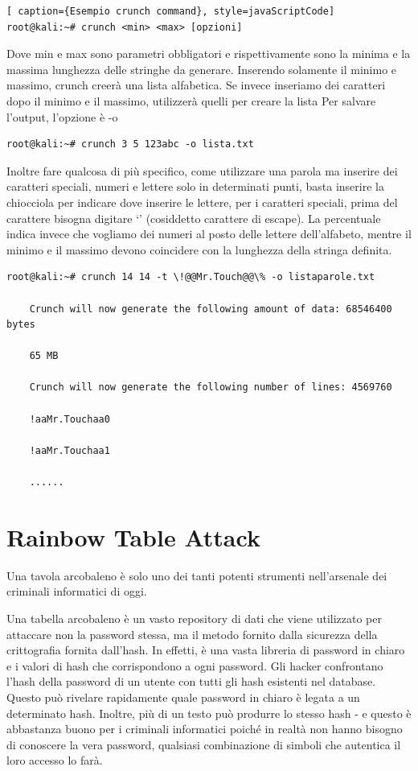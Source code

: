 \begin{lstlisting}[ caption={Esempio crunch command}, style=javaScriptCode]
root@kali:~# crunch <min> <max> [opzioni]
\end{lstlisting}
Dove min e max sono parametri obbligatori e rispettivamente sono la minima e la massima lunghezza delle stringhe da generare.
Inserendo solamente il minimo e massimo, crunch creerà una lista alfabetica.
Se invece inseriamo dei caratteri dopo il minimo e il massimo, utilizzerà quelli per creare la lista
Per salvare l’output, l’opzione è -o
\begin{lstlisting}[caption={Esempio crunch command}, style=javaScriptCode]
root@kali:~# crunch 3 5 123abc -o lista.txt
\end{lstlisting}
Inoltre fare qualcosa di più specifico, come utilizzare una parola ma inserire dei caratteri speciali, numeri e lettere solo in determinati punti, basta inserire la chiocciola per indicare dove inserire le lettere, per i caratteri speciali, prima del carattere bisogna digitare ‘’ (cosiddetto carattere di escape). La percentuale indica invece che vogliamo dei numeri al posto delle lettere dell’alfabeto, mentre il minimo e il massimo devono coincidere con la lunghezza della stringa definita.
\begin{lstlisting}[caption={Esempio crunch command}, style=javaScriptCode]
root@kali:~# crunch 14 14 -t \!@@Mr.Touch@@\% -o listaparole.txt

    Crunch will now generate the following amount of data: 68546400 bytes

    65 MB

    Crunch will now generate the following number of lines: 4569760

    !aaMr.Touchaa0

    !aaMr.Touchaa1

    ......
\end{lstlisting}
\section{Rainbow Table Attack}
Una tavola arcobaleno \cite{Rainbow_table_attack} è solo uno dei tanti potenti strumenti nell'arsenale dei criminali informatici di oggi.

Una tabella arcobaleno è un vasto repository di dati che viene utilizzato per attaccare non la password stessa, ma il metodo fornito dalla sicurezza della crittografia fornita dall'hash. In effetti, è una vasta libreria di password in chiaro e i valori di hash che corrispondono a ogni password. Gli hacker confrontano l'hash della password di un utente con tutti gli hash esistenti nel database. Questo può rivelare rapidamente quale password in chiaro è legata a un determinato hash. Inoltre, più di un testo può produrre lo stesso hash - e questo è abbastanza buono per i criminali informatici poiché in realtà non hanno bisogno di conoscere la vera password, qualsiasi combinazione di simboli che autentica il loro accesso lo farà.

